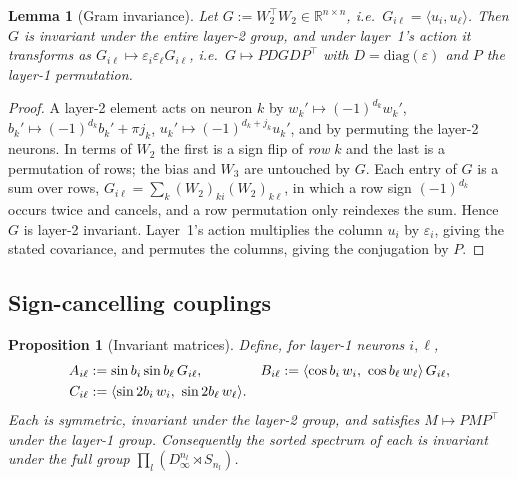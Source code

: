 \documentclass[11pt]{article}
\newtheorem{proposition}[theorem]{Proposition}
\newtheorem{lemma}[theorem]{Lemma}
\newcommand{\R}{\mathbb{R}}
\begin{document}
\begin{lemma}[Gram invariance]
\label{lem:gram}
Let $G := W_2^{\top}W_2\in\R^{n\times n}$, i.e.\ $G_{i\ell} = \langle u_i,u_\ell\rangle$. Then $G$ is
invariant under the entire layer-2 group, and under layer~1's action it transforms as
$G_{i\ell}\mapsto \varepsilon_i\varepsilon_\ell G_{i\ell}$, i.e.\ $G\mapsto PDGDP^{\top}$ with
$D=\mathrm{diag}(\varepsilon)$ and $P$ the layer-1 permutation.
\end{lemma}

\begin{proof}
A layer-2 element acts on neuron $k$ by $w_k'\mapsto(-1)^{d_k}w_k'$, $b_k'\mapsto(-1)^{d_k}b_k'+\pi
j_k$, $u_k'\mapsto(-1)^{d_k+j_k}u_k'$, and by permuting the layer-2 neurons. In terms of $W_2$ the
first is a sign flip of \emph{row} $k$ and the last is a permutation of rows; the bias and $W_3$ are
untouched by $G$. Each entry of $G$ is a sum over rows,
$G_{i\ell}=\sum_k (W_2)_{ki}(W_2)_{k\ell}$, in which a row sign $(-1)^{d_k}$ occurs twice and
cancels, and a row permutation only reindexes the sum. Hence $G$ is layer-2 invariant. Layer~1's
action multiplies the column $u_i$ by $\varepsilon_i$, giving the stated covariance, and permutes
the columns, giving the conjugation by $P$.
\end{proof}

\subsection{Sign-cancelling couplings}

\begin{proposition}[Invariant matrices]
\label{prop:matrices}
Define, for layer-1 neurons $i,\ell$,
\begin{align}
A_{i\ell} &:= \sin b_i \sin b_\ell\, G_{i\ell}, &
B_{i\ell} &:= \langle \cos b_i\, w_i,\ \cos b_\ell\, w_\ell\rangle\, G_{i\ell}, \notag\\
C_{i\ell} &:= \langle \sin 2b_i\, w_i,\ \sin 2b_\ell\, w_\ell\rangle . &&
\end{align}
Each is symmetric, invariant under the layer-2 group, and satisfies $M\mapsto PMP^{\top}$ under the
layer-1 group. Consequently the sorted spectrum of each is invariant under the full group
$\prod_{l}\left(D_\infty^{n_l}\rtimes S_{n_l}\right)$.
\end{proposition}
\end{document}
